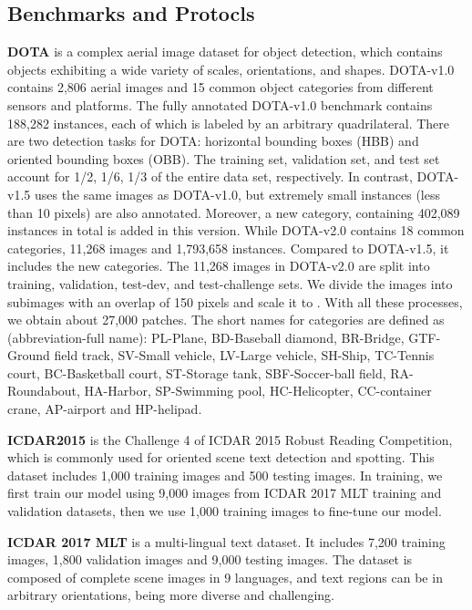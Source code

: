 \documentclass[10pt,journal,compsoc]{IEEEtran}
\begin{document}
\subsection{Benchmarks and Protocls}\label{sec:oh-sjtu}
\textbf{DOTA} \cite{xia2018dota} is a complex aerial image dataset for object detection, which contains objects exhibiting a wide variety of scales, orientations, and shapes. DOTA-v1.0 contains 2,806 aerial images and 15 common object categories from different sensors and platforms. The fully annotated DOTA-v1.0 benchmark contains 188,282 instances, each of which is labeled by an arbitrary quadrilateral. There are two detection tasks for DOTA: horizontal bounding boxes (HBB) and oriented bounding boxes (OBB). The training set, validation set, and test set account for 1/2, 1/6, 1/3 of the entire data set, respectively. 
In contrast, DOTA-v1.5 uses the same images as DOTA-v1.0, but extremely small instances (less than 10 pixels) are also annotated. Moreover, a new category, containing 402,089 instances in total is added in this version. While DOTA-v2.0 contains 18 common categories, 11,268 images and 1,793,658 instances. Compared to DOTA-v1.5, it includes the new categories. The 11,268 images in DOTA-v2.0 are split into training, validation, test-dev, and test-challenge sets.
We divide the images into  subimages with an overlap of 150 pixels and scale it to . With all these processes, we obtain about 27,000 patches. 
The short names for categories are defined as (abbreviation-full name): PL-Plane, BD-Baseball diamond, BR-Bridge, GTF-Ground field track, SV-Small vehicle, LV-Large vehicle, SH-Ship, TC-Tennis court, BC-Basketball court, ST-Storage tank, SBF-Soccer-ball field, RA-Roundabout, HA-Harbor, SP-Swimming pool, HC-Helicopter, CC-container crane, AP-airport and HP-helipad.

\textbf{ICDAR2015} \cite{karatzas2015icdar} is the Challenge 4 of ICDAR 2015 Robust Reading Competition, which is commonly used for oriented scene text detection and spotting. This dataset includes 1,000 training images and 500 testing images. In training, we first train our model using 9,000 images from ICDAR 2017 MLT training and validation datasets, then we use 1,000 training images to fine-tune our model.

\textbf{ICDAR 2017 MLT} \cite{nayef2017icdar2017} is a multi-lingual text dataset. It includes 7,200 training images, 1,800 validation images and 9,000 testing images. The dataset is composed of complete scene images in 9 languages, and text regions can be in arbitrary orientations, being more diverse and challenging.
\end{document}

